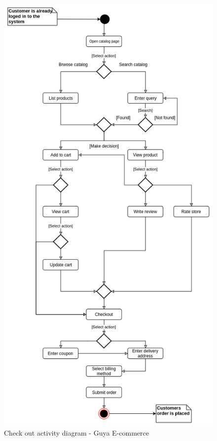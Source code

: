 \clearpage
\begin{figure}[!h]
\center
\includegraphics[width=12cm,keepaspectratio]{activity-diagrams/checkout_activity}
\caption{Check out activity diagram - Guya E-commerce}
\end{figure}

